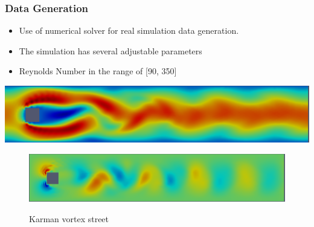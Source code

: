 \documentclass[18pt]{beamer}
\begin{document}
\begin{frame}[t]
  \frametitle{Data Generation}
  \begin{itemize}
  \item Use of numerical solver for real simulation data generation.
  \item The simulation has several adjustable parameters
  \item Reynolds Number in the range of [90, 350]
  \end{itemize}
  \begin{center}
    \includegraphics[scale=0.21]{images/x-direction}
  \end{center}
  \begin{center}
    \begin{figure}[htb]
    \includegraphics[scale=0.21]{images/y-direction} \\
    \caption{Karman vortex street}
    \end{figure}
  \end{center}
\end{frame}
\end{document}

